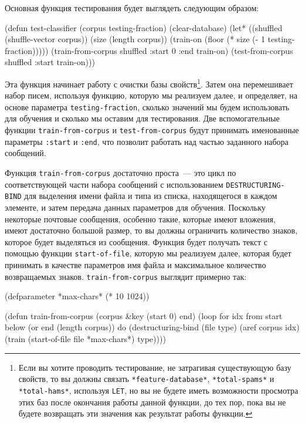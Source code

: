 Основная функция тестирования будет выглядеть следующим образом:

\begin{myverb}
(defun test-classifier (corpus testing-fraction)
  (clear-database)
  (let* ((shuffled (shuffle-vector corpus))
         (size (length corpus))
         (train-on (floor (* size (- 1 testing-fraction)))))
    (train-from-corpus shuffled :start 0 :end train-on)
    (test-from-corpus shuffled :start train-on)))
\end{myverb}

Эта функция начинает работу с очистки базы свойств\footnote{Если вы хотите проводить
  тестирование, не затрагивая существующую базу свойств, то вы должны связать
  \lstinline{*feature-database*}, \lstinline{*total-spams*} и \lstinline{*total-hams*}, используя
  \lstinline{LET}, но вы не будете иметь возможности просмотра этих баз после окончания работы
  данной функции, до тех пор, пока вы не будете возвращать эти значения как результат
  работы функции.}\hspace{\footnotenegspace}. Затем она перемешивает набор писем, используя функцию, которую мы
реализуем далее, и определяет, на основе параметра \lstinline{testing-fraction}, сколько
значений мы будем использовать для обучения и сколько мы оставим для тестирования.  Две
вспомогательные функции \lstinline{train-from-corpus} и \lstinline{test-from-corpus} будут
принимать именованные параметры \lstinline{:start} и \lstinline{:end}, что позволит работать над
частью заданного набора сообщений.

Функция \lstinline{train-from-corpus} достаточно проста~--- это цикл по соответствующей части
набора сообщений с использованием \lstinline{DESTRUCTURING-BIND} для выделения имени файла и
типа из списка, находящегося в каждом элементе, и затем передача данных параметров для
обучения.  Поскольку некоторые почтовые сообщения, особенно такие, которые имеют вложения,
имеют достаточно большой размер, то вы должны ограничить количество знаков, которое будет
выделяться из сообщения.  Функция будет получать текст с помощью функции
\lstinline{start-of-file}, которую мы реализуем далее, которая будет принимать в качестве
параметров имя файла и максимальное количество возвращаемых знаков.
\lstinline{train-from-corpus} выглядит примерно так:

\begin{myverb}
(defparameter *max-chars* (* 10 1024))

(defun train-from-corpus (corpus &key (start 0) end)
  (loop for idx from start below (or end (length corpus)) do
        (destructuring-bind (file type) (aref corpus idx)
          (train (start-of-file file *max-chars*) type))))
\end{myverb}

